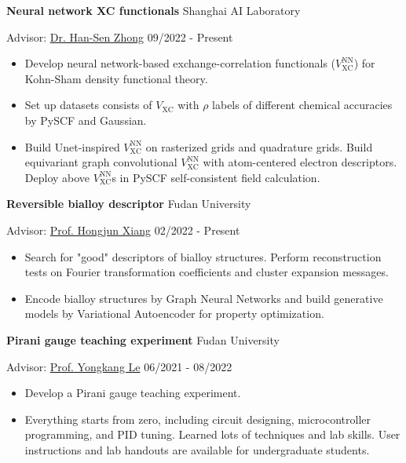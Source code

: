 \documentclass[11pt]{article} %
\begin{document}
\textbf{Neural network XC functionals}
\hfill Shanghai AI Laboratory

Advisor: \href{https://scholar.google.com/citations?user=X_ZfX8sAAAAJ}{Dr. Han-Sen Zhong}
\hfill 09/2022 - Present

\begin{itemize}
    \item Develop neural network-based exchange-correlation functionals ($V_{\mathrm{XC}}^{\mathrm{NN}}$) for Kohn-Sham density functional theory.
    \item Set up datasets consists of $V_{\mathrm{XC}}$ with $\rho$ labels of different chemical accuracies by PySCF and Gaussian.
    \item Build Unet-inspired $V_{\mathrm{XC}}^{\mathrm{NN}}$ on rasterized grids and quadrature grids. Build equivariant graph convolutional $V_{\mathrm{XC}}^{\mathrm{NN}}$ with atom-centered electron descriptors. Deploy above $V_{\mathrm{XC}}^{\mathrm{NN}}$s in PySCF self-consistent field calculation.
\end{itemize}



\textbf{Reversible bialloy descriptor}
\hfill Fudan University

Advisor: \href{https://scholar.google.com/citations?user=5GcATiIAAAAJ}{Prof. Hongjun Xiang}
\hfill 02/2022 - Present

\begin{itemize}
    \item Search for "good" descriptors of bialloy structures. Perform  reconstruction tests on Fourier transformation coefficients and cluster expansion messages.
    \item Encode bialloy structures by Graph Neural Networks and build generative models by Variational Autoencoder for property optimization.
\end{itemize}



\textbf{Pirani gauge teaching experiment}
\hfill Fudan University

Advisor: \href{http://phylab.fudan.edu.cn/doku.php?id=home:xiaole}{Prof. Yongkang Le}
\hfill 06/2021 - 08/2022

\begin{itemize}
    \item Develop a Pirani gauge teaching experiment.
    \item Everything starts from zero, including circuit designing, microcontroller programming, and PID tuning. Learned lots of techniques and lab skills. User instructions and lab handouts are available for undergraduate students.
\end{itemize}
\end{document}
